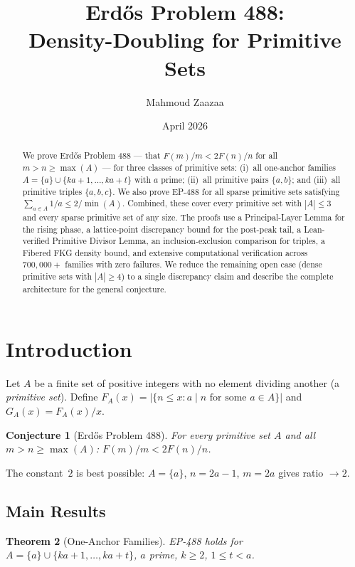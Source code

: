 \documentclass[11pt,a4paper]{article}
\title{Erd\H{o}s Problem 488:\\Density-Doubling for Primitive Sets}
\author{Mahmoud Zaazaa}
\date{April 2026}
\newtheorem{theorem}{Theorem}[section]
\newtheorem{conjecture}[theorem]{Conjecture}
\theoremstyle{definition}
\begin{document}
\maketitle

\begin{abstract}
We prove Erd\H{o}s Problem 488 --- that $F(m)/m < 2F(n)/n$ for all
$m > n \geq \max(A)$ --- for three classes of primitive sets:
(i)~all one-anchor families $A = \{a\} \cup \{ka{+}1,\ldots,ka{+}t\}$
with $a$ prime; (ii)~all primitive pairs $\{a,b\}$; and (iii)~all
primitive triples $\{a,b,c\}$. We also prove EP-488 for all sparse
primitive sets satisfying $\sum_{a \in A} 1/a \leq 2/\min(A)$.
Combined, these cover every primitive set with $|A| \leq 3$ and every
sparse primitive set of any size. The proofs use a Principal-Layer
Lemma for the rising phase, a lattice-point discrepancy bound for the
post-peak tail, a Lean-verified Primitive Divisor Lemma, an
inclusion-exclusion comparison for triples, a Fibered FKG density
bound, and extensive computational verification across $700{,}000+$
families with zero failures. We reduce the remaining open case (dense
primitive sets with $|A| \geq 4$) to a single discrepancy claim and
describe the complete architecture for the general conjecture.
\end{abstract}

\tableofcontents
\newpage

\section{Introduction}

Let $A$ be a finite set of positive integers with no element dividing
another (a \emph{primitive set}). Define
$F_A(x) = |\{n \leq x : a \mid n \text{ for some } a \in A\}|$ and
$G_A(x) = F_A(x)/x$.

\begin{conjecture}[Erd\H{o}s Problem 488]
For every primitive set $A$ and all $m > n \geq \max(A)$:
$F(m)/m < 2F(n)/n$.
\end{conjecture}

The constant~$2$ is best possible: $A = \{a\}$, $n = 2a{-}1$, $m = 2a$
gives ratio $\to 2$.

\subsection{Main Results}

\begin{theorem}[One-Anchor Families]\label{thm:main}
EP-488 holds for $A = \{a\} \cup \{ka{+}1, \ldots, ka{+}t\}$, $a$ prime,
$k \geq 2$, $1 \leq t < a$.
\end{theorem}
\end{document}
